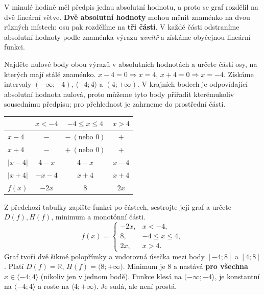 \documentclass[11pt,a4paper]{article}
\begin{document}
V minulé hodině měl předpis jednu absolutní hodnotu, a proto se graf rozdělil na dvě lineární větve. \textbf{Dvě absolutní hodnoty} mohou měnit znaménko na dvou různých místech: osu pak rozdělíme na \textbf{tři části}. V každé části odstraníme absolutní hodnoty podle znaménka výrazu \emph{uvnitř} a získáme obyčejnou lineární funkci.
\begin{prikladReseniBox}[title={Příklad 1}]
Najděte nulové body obou výrazů v absolutních hodnotách a určete části osy, na kterých mají stálé znaménko.
\tcblower
$x-4=0\Rightarrow x=4$, $x+4=0\Rightarrow x=-4$. Získáme intervaly $(-\infty;-4)$, $\langle-4;4\rangle$ a $(4;+\infty)$. V krajních bodech je odpovídající absolutní hodnota nulová, proto můžeme tyto body přiřadit kterémukoliv sousednímu předpisu; pro přehlednost je zahrneme do prostřední části.
\end{prikladReseniBox}
\begin{center}
\small
\renewcommand{\arraystretch}{1.18}
\begin{tabular}{@{}lccc@{}}
\toprule
& $x<-4$ & $-4\le x\le4$ & $x>4$\\ \midrule
$x-4$ & $-$ & $-\ (\text{nebo }0)$ & $+$\\
$x+4$ & $-$ & $+\ (\text{nebo }0)$ & $+$\\
$|x-4|$ & $4-x$ & $4-x$ & $x-4$\\
$|x+4|$ & $-x-4$ & $x+4$ & $x+4$\\ \midrule
$f(x)$ & $-2x$ & $8$ & $2x$\\ \bottomrule
\end{tabular}
\end{center}
\begin{prikladReseniBox}[title={Příklad 2}]
Z předchozí tabulky zapište funkci po částech, sestrojte její graf a určete $D(f),H(f)$, minimum a monotónní části.
\tcblower
\[
f(x)=\begin{cases}-2x,&x<-4,\\8,&-4\le x\le4,\\2x,&x>4.\end{cases}
\]
Graf tvoří dvě šikmé polopřímky a vodorovná úsečka mezi body $[-4;8]$ a $[4;8]$. Platí $D(f)=\mathbb R$, $H(f)=\langle8;+\infty)$. Minimum je $8$ a nastává \textbf{pro všechna} $x\in\langle-4;4\rangle$ (nikoliv jen v jednom bodě). Funkce klesá na $(-\infty;-4\rangle$, je konstantní na $\langle-4;4\rangle$ a roste na $\langle4;+\infty)$. Je sudá, ale není prostá.
\end{prikladReseniBox}
\end{document}
